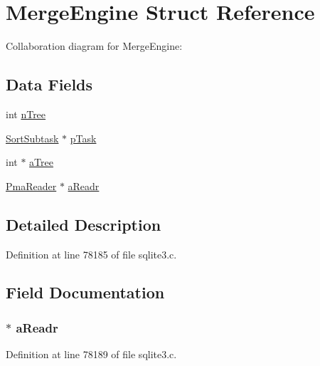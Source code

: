 \hypertarget{struct_merge_engine}{}\section{Merge\+Engine Struct Reference}
\label{struct_merge_engine}


Collaboration diagram for Merge\+Engine\+:
\subsection*{Data Fields}
\begin{DoxyCompactItemize}
\item 
int \hyperlink{struct_merge_engine_a27deed48b4e7b04d51fa2105eede6f26}{n\+Tree}
\item 
\hyperlink{struct_sort_subtask}{Sort\+Subtask} $\ast$ \hyperlink{struct_merge_engine_ab1de7a866e3b281bba80ccb606ec2ae1}{p\+Task}
\item 
int $\ast$ \hyperlink{struct_merge_engine_af09e1c62e2143bcde90a56e8733257a7}{a\+Tree}
\item 
\hyperlink{struct_pma_reader}{Pma\+Reader} $\ast$ \hyperlink{struct_merge_engine_ab7579e1271575adaf3ec4877df435078}{a\+Readr}
\end{DoxyCompactItemize}


\subsection{Detailed Description}


Definition at line 78185 of file sqlite3.\+c.



\subsection{Field Documentation}
\hypertarget{struct_merge_engine_ab7579e1271575adaf3ec4877df435078}{}
\subsubsection[{a\+Readr}]{$\ast$ a\+Readr}\label{struct_merge_engine_ab7579e1271575adaf3ec4877df435078}


Definition at line 78189 of file sqlite3.\+c.

\hypertarget{struct_merge_engine_af09e1c62e2143bcde90a56e8733257a7}{}
